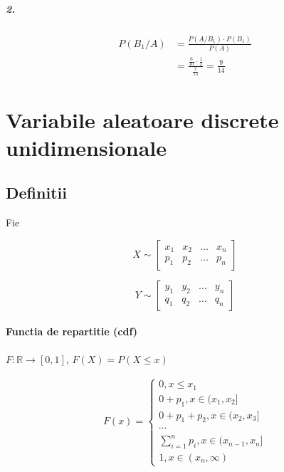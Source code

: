 \documentclass[oneside]{memoir}
\begin{document}
\subparagraph*{2.}
\begin{center}
    \begin{equation*}
        \begin{split}
P(B_1/A) &= \frac{P(A/B_1) \cdot  P(B_1)}{P(A)}\\
&=\frac{\frac{6}{10}\cdot \frac{1}{2}}{\frac{7}{15}} = \frac{9}{14}
        \end{split}
    \end{equation*}
\end{center}

\section[Variabile aleatoare discrete]{Variabile aleatoare discrete unidimensionale}
\subsection*{Definitii}
Fie
\begin{center}
    \begin{equation*}
X \sim \begin{bmatrix}
    x_1 & x_2 & \dots & x_n \\
    p_1 & p_2 & \dots & p_n
\end{bmatrix}
    \end{equation*}
\end{center}
\begin{center}
    \begin{equation*}
Y \sim \begin{bmatrix}
    y_1 & y_2 & \dots & y_n \\
    q_1 & q_2 & \dots & q_n
\end{bmatrix}
    \end{equation*}
\end{center}

\paragraph*{Functia de repartitie (cdf)} $F:\mathbb{R}\rightarrow[0,1]$, $F(X) = P(X\leq x)$

\begin{center}
    \begin{equation*}
        \begin{split}
F(x) = \left\{
    \begin{array}{ll}
          0, x \leq x_1 \\
        0 + p_1, x \in (x_1, x_2]\\
          0 + p_1 + p_2, x \in (x_2, x_3] \\
          \cdots \\
          \sum_{i=1}^{n}p_i, x \in (x_{n-1}, x_n] \\
          1, x \in (x_n, \infty)
    \end{array} 
    \right. 
        \end{split}
    \end{equation*}
\end{center}
\end{document}
